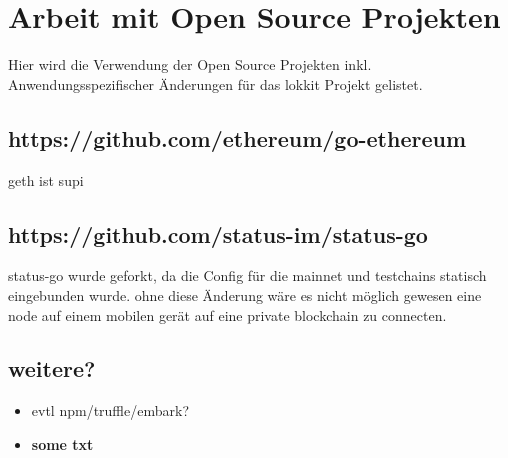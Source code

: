 \chapter{Arbeit mit Open Source Projekten}
\label{app:Open_Source}
Hier wird die Verwendung der Open Source Projekten inkl. Anwendungsspezifischer Änderungen für das lokkit Projekt gelistet.

\section{https://github.com/ethereum/go-ethereum}
\label{app:sec:Go_Ethereum}
geth ist supi

\section{https://github.com/status-im/status-go}
\label{app:sec:Status_Go}
status-go wurde geforkt, da die Config für die mainnet und testchains statisch eingebunden wurde. ohne diese Änderung wäre es nicht möglich gewesen eine node auf einem mobilen gerät auf eine private blockchain zu connecten.

\section{weitere?}
\label{app:sec:XXXXX}
\begin{itemize}
    \item{evtl npm/truffle/embark?}
    \item \textbf{some txt}
\end{itemize}